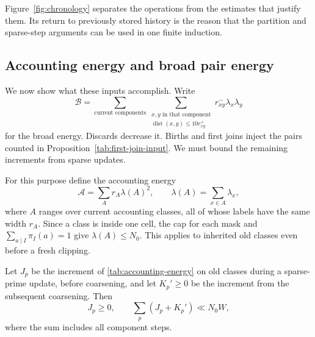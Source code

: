 Figure~\ref{fig:chronology} separates the operations from the estimates
that justify them. Its return to previously stored history is the reason
that the partition and sparse-step arguments can be used in one finite
induction.



\subsection{Accounting energy and broad pair energy}

We now show what these inputs accomplish.  Write
\[
 \mathcal B
 =\sum_{\text{current components}}
   \sum_{\substack{x,y\text{ in that component}\\
               \operatorname{dist}(x,y)\le10r_{xy}^+}}
       r_{xy}^-\lambda_x\lambda_y
\]
for the broad energy.  Discards decrease it.  Births and first joins
inject the pairs counted in
Proposition~\ref{tab:first-join-input}.  We must bound the remaining
increments from sparse updates.

For this purpose define the accounting energy
\begin{equation}
 \mathcal A=\sum_A r_A\lambda(A)^2,
 \qquad \lambda(A)=\sum_{x\in A}\lambda_x,
 \label{tab:accounting-energy}
\end{equation}
where $A$ ranges over current accounting classes, all of whose
labels have the same width $r_A$.  Since a class is inside one cell,
the cap for each mask and $\sum_{a\mid I}\pi_I(a)=1$ give
$\lambda(A)\le N_0$.  This applies to inherited old classes even
before a fresh clipping.

\begin{lemma}
\label{tab:variance-budget}
Let $J_p$ be the increment of \eqref{tab:accounting-energy} on old
classes during a sparse-prime update, before coarsening, and let
$K_p'\ge0$ be the increment from the subsequent coarsening.  Then
\[
 J_p\ge0,\qquad
 \sum_p(J_p+K_p')\ll N_0W,
\]
where the sum includes all component steps.
\end{lemma}

